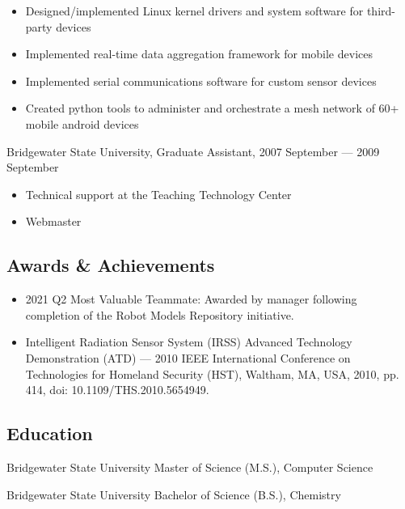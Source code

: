 \documentclass[letterpaper,12pt]{article}
\begin{document}
\begin{itemize}
\item Designed/implemented Linux kernel drivers and system software for
  third-party devices
\item Implemented real-time data aggregation framework for mobile devices
\item Implemented serial communications software for custom sensor devices
\item Created python tools to administer and orchestrate a mesh network of 60+
  mobile android devices
\end{itemize}

Bridgewater State University, Graduate Assistant, 2007 September --- 2009 September

\begin{itemize}
\item Technical support at the Teaching Technology Center
\item Webmaster
\end{itemize}

\subsection*{Awards \& Achievements}

\begin{itemize}
\item 2021 Q2 Most Valuable Teammate: Awarded by manager following completion
  of the Robot Models Repository initiative.
\item Intelligent Radiation Sensor System (IRSS) Advanced Technology
  Demonstration (ATD) --- 2010 IEEE International Conference on Technologies
  for Homeland Security (HST), Waltham, MA, USA, 2010, pp. 414, doi:
  10.1109/THS.2010.5654949.
\end{itemize}

\subsection*{Education}

Bridgewater State University
Master of Science (M.S.), Computer Science

Bridgewater State University
Bachelor of Science (B.S.), Chemistry
\end{document}
